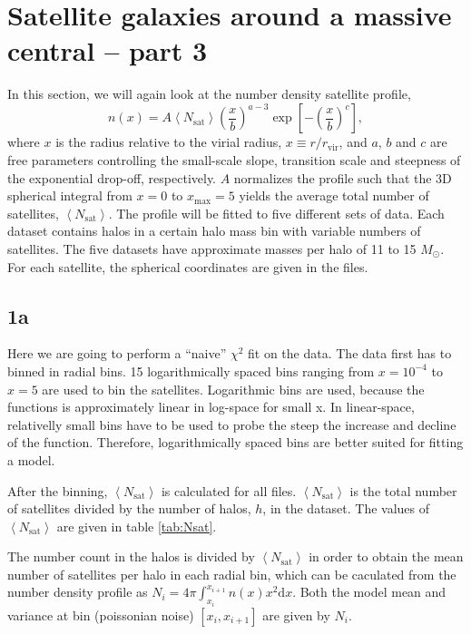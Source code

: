 \section{Satellite galaxies around a massive central – part 3}
In this section, we will again look at the number density satellite profile,
\begin{equation}
    n(x) = A\left\langle N_\mathrm{sat} \right\rangle \left( \frac{x}{b} \right)^{a-3} \exp\left[-\left(\frac{x}{b}\right)^c\right],
\end{equation}
where $x$ is the radius relative to the virial radius, $x\equiv r/r_\mathrm{vir}$, and $a$, $b$ and $c$ are free parameters controlling the small-scale slope, transition scale and steepness of the exponential drop-off, respectively. $A$ normalizes the profile such that the 3D spherical integral from $x=0$ to $x_\mathrm{max}=5$ yields the average total number of satellites, $\left\langle N_\mathrm{sat} \right\rangle$. The profile will be fitted to five different sets of data. Each dataset contains halos in a certain halo mass bin with variable numbers of satellites. The five datasets have approximate masses per halo of 11 to 15 $M_\odot$.  For each satellite, the spherical coordinates are given in the files.

\subsection*{1a}
Here we are going to perform a ``naive'' $\chi^2$ fit on the data. The data first has to binned in radial bins. 15 logarithmically spaced bins ranging from $x=10^{-4}$ to $x=5$ are used to bin the satellites. Logarithmic bins are used, because the functions is approximately linear in log-space for small x. In linear-space, relativelly small bins have to be used to probe the steep the increase and decline of the function. Therefore, logarithmically spaced bins are better suited for fitting a model.

After the binning, $\left\langle N_\mathrm{sat} \right\rangle$ is calculated for all files. $\left\langle N_\mathrm{sat} \right\rangle$ is the total number of satellites divided by the number of halos, $h$, in the dataset. The values of $\left\langle N_\mathrm{sat} \right\rangle$ are given in table \ref{tab:Nsat}.

The number count in the halos is divided by $\left\langle N_\mathrm{sat} \right\rangle$ in order to obtain the mean number of satellites per halo in each radial bin, which can be caculated from the number density profile as $N_i = 4\pi \int_{x_i}^{x_{i+1}} n(x)x^2\mathrm{d}x$. Both the model mean and variance at bin (poissonian noise) $[x_i, x_{i+1}]$ are given by $N_i$. 

